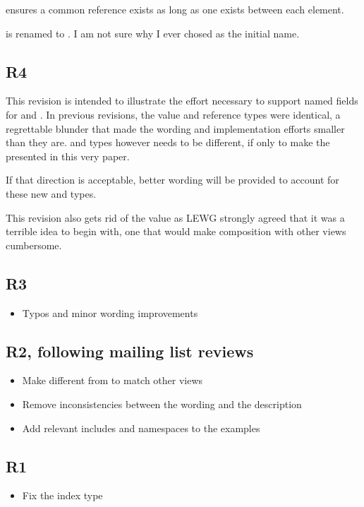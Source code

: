 \documentclass{wg21}
\begin{document}
 ensures a common reference exists as long as one exists between each element.

 is renamed to . I am not sure why I ever chosed  as the initial name.

\subsection{R4}

This revision is intended to illustrate the effort necessary to support named fields for  and .
In previous revisions, the value and reference types were identical, a regrettable blunder that made the wording and implementation efforts smaller than they are.
 and  types however needs to be different, if only to make the  presented in this very paper.

If that direction is acceptable, better wording will be provided to account for these new  and  types.

This revision also gets rid of the   value as LEWG strongly agreed that it was a terrible idea to begin with, one that would make composition with other views cumbersome.

\subsection{R3}

\begin{itemize}
    \item Typos and minor wording improvements
\end{itemize}

\subsection{R2, following mailing list reviews}
\begin{itemize}
    \item Make  different from   to match other views
    \item Remove inconsistencies between the wording and the description
    \item Add relevant includes and namespaces to the examples
\end{itemize}


\subsection{R1}
\begin{itemize}
\item Fix the index type
\end{itemize}
\end{document}

